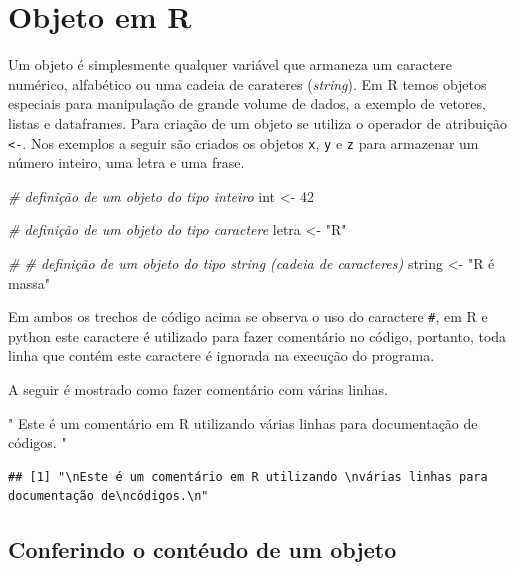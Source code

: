 \documentclass[
]{article}
\newenvironment{Shaded}{\begin{snugshade}}{\end{snugshade}}
\newcommand{\CommentTok}[1]{\textcolor[rgb]{0.56,0.35,0.01}{\textit{#1}}}
\newcommand{\DecValTok}[1]{\textcolor[rgb]{0.00,0.00,0.81}{#1}}
\newcommand{\NormalTok}[1]{#1}
\newcommand{\OtherTok}[1]{\textcolor[rgb]{0.56,0.35,0.01}{#1}}
\newcommand{\StringTok}[1]{\textcolor[rgb]{0.31,0.60,0.02}{#1}}
\begin{document}
\hypertarget{objeto-em-r}{%
\section{Objeto em R}\label{objeto-em-r}}

Um objeto é simplesmente qualquer variável que armaneza um caractere
numérico, alfabético ou uma cadeia de carateres (\emph{string}). Em R
temos objetos especiais para manipulação de grande volume de dados, a
exemplo de vetores, listas e dataframes. Para criação de um objeto se
utiliza o operador de atribuição \texttt{\textless{}-}. Nos exemplos a
seguir são criados os objetos \texttt{x}, \texttt{y} e \texttt{z} para
armazenar um número inteiro, uma letra e uma frase.

\begin{Shaded}
\begin{Highlighting}[]
\CommentTok{\# definição de um objeto do tipo inteiro}
\NormalTok{int }\OtherTok{\textless{}{-}} \DecValTok{42}

\CommentTok{\# definição de um objeto do tipo caractere}
\NormalTok{letra }\OtherTok{\textless{}{-}} \StringTok{"R"}

\CommentTok{\# \# definição de um objeto do tipo string (cadeia de caracteres)}
\NormalTok{string }\OtherTok{\textless{}{-}} \StringTok{"R é massa"}
\end{Highlighting}
\end{Shaded}

Em ambos os trechos de código acima se observa o uso do caractere
\texttt{\#}, em R e python este caractere é utilizado para fazer
comentário no código, portanto, toda linha que contém este caractere é
ignorada na execução do programa.

A seguir é mostrado como fazer comentário com várias linhas.

\begin{Shaded}
\begin{Highlighting}[]
\StringTok{"}
\StringTok{Este é um comentário em R utilizando }
\StringTok{várias linhas para documentação de}
\StringTok{códigos.}
\StringTok{"}
\end{Highlighting}
\end{Shaded}

\begin{verbatim}
## [1] "\nEste é um comentário em R utilizando \nvárias linhas para documentação de\ncódigos.\n"
\end{verbatim}

\hypertarget{conferindo-o-contuxe9udo-de-um-objeto}{%
\subsection{Conferindo o contéudo de um
objeto}\label{conferindo-o-contuxe9udo-de-um-objeto}}
\end{document}
